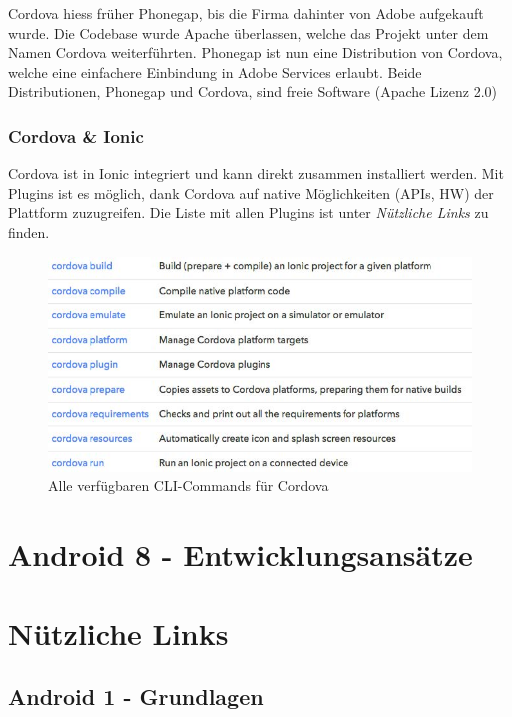 \documentclass[a4paper]{article}
\begin{document}
{	Cordova hiess früher Phonegap, bis die Firma dahinter von Adobe aufgekauft wurde. 
	Die Codebase wurde Apache überlassen, welche das Projekt unter dem Namen Cordova weiterführten.
	Phonegap ist nun eine Distribution von Cordova, welche eine einfachere Einbindung in Adobe Services erlaubt.
	Beide Distributionen, Phonegap und Cordova, sind freie Software (Apache Lizenz 2.0)
	
	\subsubsection{Cordova \& Ionic}
	
	Cordova ist in Ionic integriert und kann direkt zusammen installiert werden.
	Mit Plugins ist es möglich, dank Cordova auf native Möglichkeiten (APIs, HW) der Plattform zuzugreifen. 
	Die Liste mit allen Plugins ist unter \textit{Nützliche Links} zu finden.
	
	\begin{figure}[!htb]
		\centering
		\includegraphics[width=.7\textwidth]{img/android7/cordova_commands.jpg}
		\caption{Alle verfügbaren CLI-Commands für Cordova}
		\label{fig:cordova_commands}
	\end{figure}
	
		
\newpage
\section{Android 8 - Entwicklungsansätze}

	
	
	
\newpage
	
\section{Nützliche Links}

	\subsection{Android 1 - Grundlagen}
	
}
\end{document}
